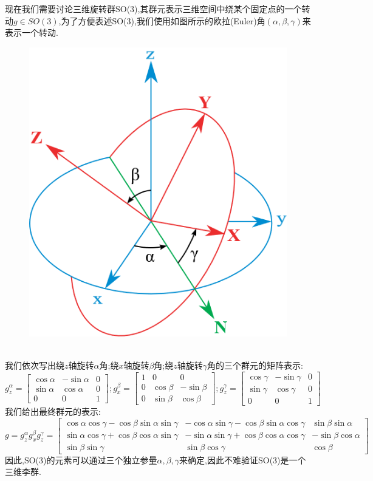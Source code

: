 \begin{example}
	现在我们需要讨论三维旋转群SO(3),其群元表示三维空间中绕某个固定点的一个转动$g\in SO(3)$,为了方便表述SO(3),我们使用如图所示的欧拉(Euler)角$(\alpha,\beta,\gamma)$来表示一个转动.
	\begin{figure}[tbph]
		\centering
		\includegraphics[width=0.4\linewidth]{"figure/Euler angle"}
		\caption{}
		\label{fig:euler-angle}
	\end{figure}\\
	我们依次写出绕$z$轴旋转$\alpha$角;绕$x$轴旋转$\beta$角;绕$z$轴旋转$\gamma$角的三个群元的矩阵表示:
	\begin{equation}
		g_z^\alpha={\begin{bmatrix}\cos \alpha &-\sin \alpha &0\\\sin \alpha &\cos \alpha &0\\0&0&1\end{bmatrix}};g_x^\beta={\begin{bmatrix}1&0&0\\0&\cos \beta &-\sin \beta \\0&\sin \beta &\cos \beta \end{bmatrix}};g_z^\gamma={\begin{bmatrix}\cos \gamma &-\sin \gamma &0\\\sin \gamma &\cos \gamma &0\\0&0&1\end{bmatrix}}
	\end{equation}
	我们给出最终群元的表示:
	\begin{equation}
		g=g_z^\alpha g_x^\beta g_z^\gamma={\begin{bmatrix}\cos \alpha \cos \gamma -\cos \beta \sin \alpha \sin \gamma &-\cos \alpha \sin \gamma -\cos \beta \sin \alpha \cos \gamma &\sin \beta \sin \alpha \\\sin \alpha \cos \gamma +\cos \beta \cos \alpha \sin \gamma &-\sin \alpha \sin \gamma +\cos \beta \cos \alpha \cos \gamma &-\sin \beta \cos \alpha \\\sin \beta \sin \gamma &\sin \beta \cos \gamma &\cos \beta \end{bmatrix}}
	\end{equation}
	因此,SO(3)的元素可以通过三个独立参量$\alpha,\beta,\gamma$来确定,因此不难验证SO(3)是一个三维李群.
	

\end{example}
